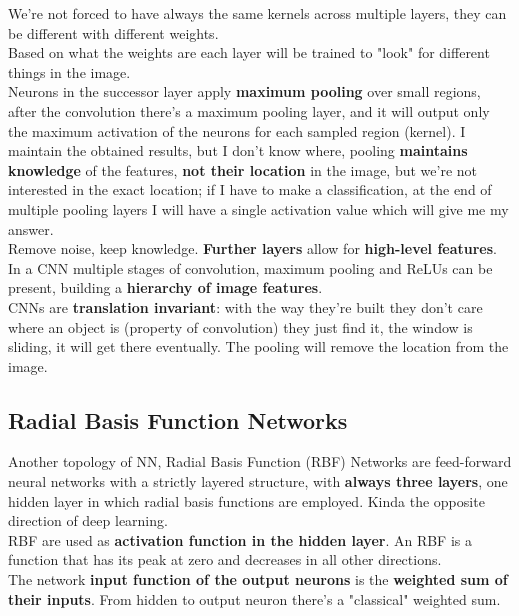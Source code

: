 We're not forced to have always the same kernels across multiple layers, they can be different with different weights.\\
Based on what the weights are each layer will be trained to "look" for different things in the image.\\

Neurons in the successor layer apply \textbf{maximum pooling} over small regions, after the convolution there's a maximum pooling layer, and it will output only the maximum activation of the neurons for each sampled region (kernel). I maintain the obtained results, but I don't know where, pooling \textbf{maintains knowledge} of the features, \textbf{not their location} in the image, but we're not interested in the exact location; if I have to make a classification, at the end of multiple pooling layers I will have a single activation value which will give me my answer. \\
Remove noise, keep knowledge. \textbf{Further layers} allow for \textbf{high-level features}.\\

In a CNN multiple stages of convolution, maximum pooling and ReLUs can be present, building a \textbf{hierarchy of image features}.\\

CNNs are \textbf{translation invariant}: with the way they're built they don't care where an object is (property of convolution) they just find it, the window is sliding, it will get there eventually. The pooling will remove the location from the image.\\


\newpage

\subsection{Radial Basis Function Networks}
Another topology of NN, Radial Basis Function (RBF) Networks are feed-forward neural networks with a strictly layered structure, with \textbf{always three layers}, one hidden layer in which radial basis functions are employed. Kinda the opposite direction of deep learning.\\

RBF are used as \textbf{activation function in the hidden layer}. An RBF is a function that has its peak at zero and decreases in all other directions.\\

The network \textbf{input function of the output neurons} is the \textbf{weighted sum of their inputs}. From hidden to output neuron there's a "classical" weighted sum.\\

